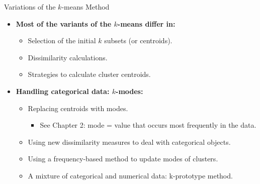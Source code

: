 \begin{frame}{Variations of the $k$-means Method}
	\begin{itemize}
		\item \textbf{Most of the variants of the $k$-means differ in:}
		\begin{itemize}
			\item Selection of the initial $k$ subsets (or centroids).
			\item Dissimilarity calculations.
			\item Strategies to calculate cluster centroids.
		\end{itemize}
		\item \textbf{Handling categorical data: $k$-modes:}
		\begin{itemize}
			\item Replacing centroids with modes.
			\begin{itemize}
				\item See Chapter 2: mode = value that occurs most frequently 
				in the data.
			\end{itemize}
			\item Using new dissimilarity measures to deal with categorical 
			objects.
			\item Using a frequency-based method to update modes of clusters.
			\item A mixture of categorical and numerical data: k-prototype 
			method.
		\end{itemize}
	\end{itemize}
\end{frame}

